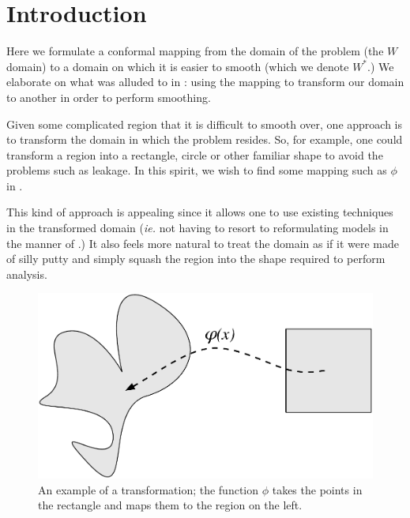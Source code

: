 
\section{Introduction}

Here we formulate a conformal mapping from the domain of the problem (the $W$ domain) to a domain on which it is easier to smooth (which we denote $W^*$.) We elaborate on what was alluded to in \cite{eilerstalk}: using the \sch mapping to transform our domain to another in order to perform smoothing. 

Given some complicated region that it is difficult to smooth over, one approach is to transform the domain in which the problem resides. So, for example, one could transform a region into a rectangle, circle or other familiar shape to avoid the problems such as leakage. In this spirit, we wish to find some mapping such as $\phi$ in .

This kind of approach is appealing since it allows one to use existing techniques in the transformed domain (\emph{ie.} not having to resort to reformulating models in the manner of \cite{wangranalli}.) It also feels more natural to treat the domain as if it were made of silly putty and simply squash the region into the shape required to perform analysis.

\begin{figure} [htbp]
\centering
\includegraphics[scale=0.3]{sc/figs/simpledia.pdf}
\caption{An example of a transformation; the function $\phi$ takes the points in the rectangle and maps them to the region on the left.}
\label{simpledia}
\end{figure}


